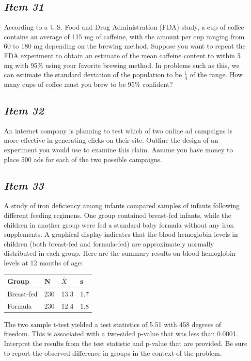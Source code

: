 \subsection{\textbf{\textit{Item 31}}}
According to a U.S. Food and Drug Administration (FDA) study, a cup of coffee contains an average of 115 mg of caffeine, with the amount per cup ranging from 60 to 180 mg depending on the brewing method.  Suppose you want to repeat the FDA experiment to obtain an estimate of the mean caffeine content to within 5 mg with 95\% using your favorite brewing method.  In problems such as this, we can estimate the standard deviation of the population to be $\frac{1}{4}$ of the range. How many cups of coffee must you brew to be 95\% confident?  

\subsection{\textbf{\textit{Item 32}}}
An internet company is planning to test which of two online ad campaigns is more effective in generating clicks on their site.  Outline the design of an experiment you would use to examine this claim.  Assume you have money to place 500 ads for each of the two possible campaigns.

\subsection{\textbf{\textit{Item 33}}}
A study of iron deficiency among infants compared samples of infants following different feeding regimens.  One group contained breast-fed infants, while the children in another group were fed a standard baby formula without any iron supplements.  
A graphical display indicates that the 
blood hemoglobin levels in children (both breast-fed and formula-fed) are approximately normally distributed in each group.  
Here are the summary results on blood hemoglobin levels at 12 months of age:

\begin{table}[!ht]
\begin{center}
\begin{tabular}{llll}
\hline
Group & N & $\bar{X}$ & s\\
\hline
Breast-fed& 230 & 13.3 & 1.7\\
Formula & 230 & 12.4 & 1.8\\
\hline
\end{tabular}
\end{center}
\end{table}
The two sample t-test yielded a test statistics of 5.51 with 458 degrees of freedom.  
This is associated with a two-sided p-value that was less than 0.0001.
Interpret the results from the test statistic and p-value that are provided.  
Be sure to report the observed difference in groups in the context of the problem.

